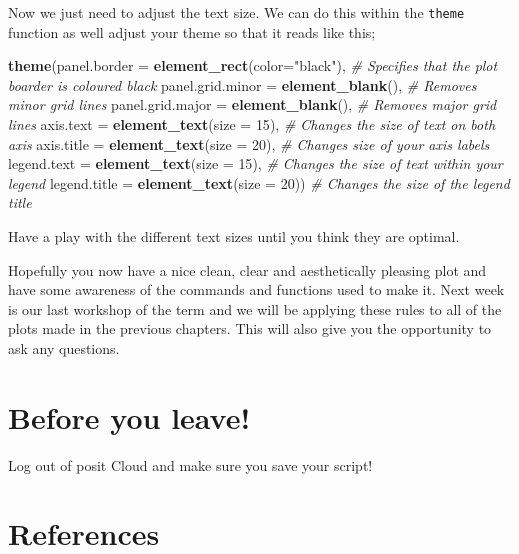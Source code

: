 \documentclass[
]{book}
\newenvironment{Shaded}{\begin{snugshade}}{\end{snugshade}}
\newcommand{\AttributeTok}[1]{\textcolor[rgb]{0.13,0.29,0.53}{#1}}
\newcommand{\CommentTok}[1]{\textcolor[rgb]{0.56,0.35,0.01}{\textit{#1}}}
\newcommand{\DecValTok}[1]{\textcolor[rgb]{0.00,0.00,0.81}{#1}}
\newcommand{\FunctionTok}[1]{\textcolor[rgb]{0.13,0.29,0.53}{\textbf{#1}}}
\newcommand{\NormalTok}[1]{#1}
\newcommand{\StringTok}[1]{\textcolor[rgb]{0.31,0.60,0.02}{#1}}
\begin{document}
Now we just need to adjust the text size. We can do this within the \texttt{theme} function as well adjust your theme so that it reads like this;

\begin{Shaded}
\begin{Highlighting}[]
\FunctionTok{theme}\NormalTok{(}\AttributeTok{panel.border =} \FunctionTok{element\_rect}\NormalTok{(}\AttributeTok{color=}\StringTok{"black"}\NormalTok{), }\CommentTok{\# Specifies that the plot boarder is coloured black}
        \AttributeTok{panel.grid.minor =} \FunctionTok{element\_blank}\NormalTok{(), }\CommentTok{\# Removes minor grid lines }
        \AttributeTok{panel.grid.major =} \FunctionTok{element\_blank}\NormalTok{(), }\CommentTok{\# Removes major grid lines }
        \AttributeTok{axis.text =} \FunctionTok{element\_text}\NormalTok{(}\AttributeTok{size =} \DecValTok{15}\NormalTok{), }\CommentTok{\# Changes the size of text on both axis }
        \AttributeTok{axis.title =} \FunctionTok{element\_text}\NormalTok{(}\AttributeTok{size =} \DecValTok{20}\NormalTok{), }\CommentTok{\# Changes size of your axis labels }
        \AttributeTok{legend.text =} \FunctionTok{element\_text}\NormalTok{(}\AttributeTok{size =} \DecValTok{15}\NormalTok{), }\CommentTok{\# Changes the size of text within your legend}
        \AttributeTok{legend.title =} \FunctionTok{element\_text}\NormalTok{(}\AttributeTok{size =} \DecValTok{20}\NormalTok{)) }\CommentTok{\# Changes the size of the legend title}
\end{Highlighting}
\end{Shaded}

Have a play with the different text sizes until you think they are optimal.

Hopefully you now have a nice clean, clear and aesthetically pleasing plot and have some awareness of the commands and functions used to make it. Next week is our last workshop of the term and we will be applying these rules to all of the plots made in the previous chapters. This will also give you the opportunity to ask any questions.

\section{Before you leave!}\label{before-you-leave-5}

Log out of posit Cloud and make sure you save your script!

\section{References}\label{references-6}
\end{document}
